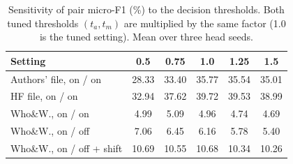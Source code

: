 \begin{table}[t]
\caption{Sensitivity of pair micro-F1 (\%) to the decision thresholds. Both tuned thresholds $(t_a, t_m)$ are multiplied by the same factor (1.0 is the tuned setting). Mean over three head seeds.}
\label{tab:sens}
\centering\footnotesize\setlength{\tabcolsep}{3pt}
\begin{tabular}{@{}lccccc@{}}
\toprule
Setting & 0.5 & 0.75 & 1.0 & 1.25 & 1.5 \\
\midrule
Authors' file, on / on & 28.33 & 33.40 & 35.77 & 35.54 & 35.01 \\
HF file, on / on & 32.94 & 37.62 & 39.72 & 39.53 & 38.99 \\
Who\&W., on / on & 4.99 & 5.09 & 4.96 & 4.74 & 4.69 \\
Who\&W., on / off & 7.06 & 6.45 & 6.16 & 5.78 & 5.40 \\
Who\&W., on / off + shift & 10.69 & 10.55 & 10.68 & 10.34 & 10.26 \\
\bottomrule
\end{tabular}
\end{table}
